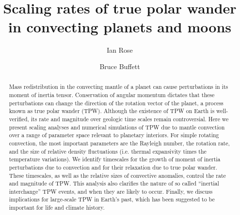 \documentclass[preprint,12pt,authoryear]{elsarticle}
\begin{document}
\begin{frontmatter}



\title{Scaling rates of true polar wander in convecting planets and moons}


\author{Ian Rose}
\author{Bruce Buffett}


\address{}

\begin{abstract}
Mass redistribution in the convecting mantle of a planet can cause perturbations in its moment of inertia tensor. 
Conservation of angular momentum dictates that these perturbations can change the direction of the rotation vector of the planet, a process known as true polar wander (TPW). 
Although the existence of TPW on Earth is well-verified, its rate and magnitude over geologic time scales remain controversial. 
Here we present scaling analyses and numerical simulations of TPW due to mantle convection over a range of parameter space relevant to planetary interiors. 
For simple rotating convection, the most important parameters are the Rayleigh number, the rotation rate, and the size of relative density fluctuations (i.e. thermal expansivity times the temperature variations). 
We identify timescales for the growth of moment of inertia perturbations due to convection and for their relaxation due to true polar wander. 
These timescales, as well as the relative sizes of convective anomalies, control the rate and magnitude of TPW.
This analysis also clarifies the nature of so called ``inertial interchange'' TPW events, and when they are likely to occur.
Finally, we discuss implications for large-scale TPW in Earth's past, which has been suggested to be important for life and climate history.
\end{abstract}


\end{frontmatter}
\end{document}
